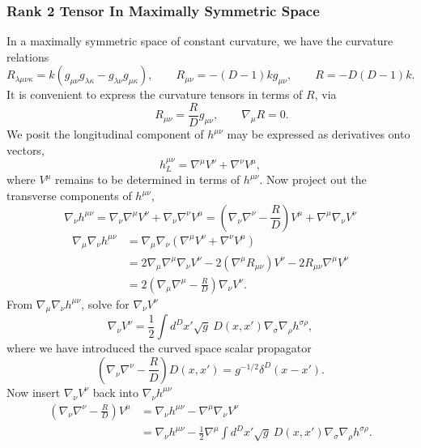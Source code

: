 \documentclass[10pt,letterpaper]{article}
\begin{document}
\subsubsection{Rank 2 Tensor In Maximally Symmetric Space}
In a maximally symmetric space of constant curvature, we have the curvature relations
\begin{equation}
R_{\lambda\mu\nu\kappa} = k(g_{\mu\nu}g_{\lambda\kappa} - g_{\lambda\nu}g_{\mu\kappa}),
\qquad R_{\mu\nu} = -(D-1)k g_{\mu\nu},\qquad  R = -D(D-1)k.
\end{equation}
It is convenient to express the curvature tensors in terms of $R$, via
\begin{equation}
\qquad R_{\mu\nu} = \frac{R}{D}g_{\mu\nu},\qquad \nabla_\mu R = 0.
\end{equation}
We posit the longitudinal component of $h^{\mu\nu}$ may be expressed as derivatives onto vectors,
\begin{equation}
h^{\mu\nu}_L = \nabla^\mu V^\nu  + \nabla^\nu V^\mu,
\end{equation}
where $V^{\mu}$ remains to be determined in terms of $h^{\mu\nu}$.
Now project out the transverse components of $h^{\mu\nu}$,
\begin{equation}
\nabla_\nu h^{\mu\nu} = \nabla_\nu \nabla^\mu V^\nu + \nabla_\nu \nabla^\nu V^\mu
= \left(\nabla_\nu\nabla^\nu - \frac{R}{D}\right)V^\mu + \nabla^\mu \nabla_\nu V^\nu 
\end{equation}
\begin{align}
\nabla_\mu\nabla_\nu h^{\mu\nu} &= \nabla_\mu\nabla_\nu( \nabla^\mu V^\nu + \nabla^\nu V^\mu)
\nonumber\\
& = 
 2 \nabla_\mu \nabla^\mu \nabla_\nu V^\nu - 2(\nabla^\mu R_{\mu\nu})V^\nu - 2 R_{\mu\nu} \nabla^\mu V^\nu
\nonumber\\
&
=  2\left(
\nabla_\mu \nabla^\mu - \frac{R}{D}\right) \nabla_\nu V^\nu.
\end{align}
From $\nabla_\mu\nabla_\nu h^{\mu\nu}$, solve for $\nabla_\nu V^\nu$
\begin{equation}
\nabla_\nu V^\nu = \frac12 \int d^Dx' \sqrt{g}\ D(x,x') \nabla_\sigma\nabla_\rho h^{\sigma\rho},
\end{equation}
where we have introduced the curved space scalar propagator
\begin{equation}
\left( \nabla_\nu \nabla^\nu -\frac{R}{D} \right)D(x,x') = g^{-1/2} \delta^D(x-x').
\end{equation}
Now insert $\nabla_\nu V^\nu$ back into $\nabla_\nu h^{\mu\nu}$
\begin{align}
\left(\nabla_\nu\nabla^\nu - \frac{R}{D}\right)V^\mu&= \nabla_\nu h^{\mu\nu} -\nabla^\mu \nabla_\nu V^\nu 
\nonumber\\
&=  \nabla_\nu h^{\mu\nu} - \frac12 \nabla^\mu  \int d^Dx' \sqrt{g}\ D(x,x') \nabla_\sigma\nabla_\rho h^{\sigma\rho}.
\end{align}
\end{document}
